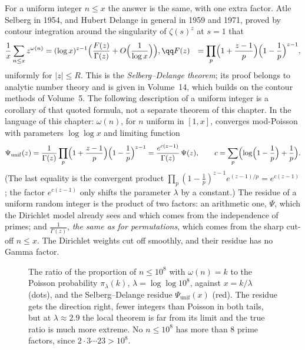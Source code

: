 For a uniform integer $n\le x$ the answer is the same, with one extra factor. Atle Selberg in 1954, and Hubert Delange in general in 1959 and 1971, proved by contour integration around the singularity of $\zeta(s)^z$ at $s=1$ that
\begin{equation}\label{eq:selbergdelange}
\begin{aligned}\frac1x\sum_{n\le x}z^{\omega(n)}&=(\log x)^{z-1}\Bigl(\frac{F(z)}{\Gamma(z)}+O\Bigl(\frac1{\log x}\Bigr)\Bigr),\qq F(z)&=\prod_p\Bigl(1+\frac{z-1}p\Bigr)\Bigl(1-\frac1p\Bigr)^{z-1},\end{aligned}
\end{equation}
uniformly for $|z|\le R$. This is the \emph{Selberg--Delange theorem}; its proof belongs to analytic number theory and is given in Volume~14, which builds on the contour methods of Volume~5. The following description of a uniform integer is a corollary of that quoted formula, not a separate theorem of this chapter. In the language of this chapter: $\omega(n)$, for $n$ uniform in $[1,x]$,
converges mod-Poisson with parameters $\log\log x$ and limiting function
\[
\Psi_{\mathrm{unif}}(z)=\frac1{\Gamma(z)}\prod_p\Bigl(1+\frac{z-1}p\Bigr)\Bigl(1-\frac1p\Bigr)^{z-1}=\frac{e^{c(z-1)}}{\Gamma(z)}\,\Psi(z),\qquad c=\sum_p\Bigl(\log\Bigl(1-\frac1p\Bigr)+\frac1p\Bigr).
\]
(The last equality is the convergent product $\prod_p(1-\frac1p)^{z-1}e^{(z-1)/p}=e^{c(z-1)}$; the factor $e^{c(z-1)}$ only shifts the parameter $\lambda$ by a constant.) The residue of a uniform random integer is the product of two factors:
an arithmetic one, $\Psi$, which the Dirichlet model already sees and which comes from the independence of primes; and $\frac1{\Gamma(z)}$, \emph{the same as for permutations}, which comes from the sharp cut-off $n\le x$. The Dirichlet weights cut off
smoothly, and their residue has no Gamma factor.

\begin{figure}[ht]
\centering{}
\caption{The ratio of the proportion of $n\le10^8$ with $\omega(n)=k$ to the Poisson probability $\pi_\lambda(k)$, $\lambda=\log\log10^8$, against $x=k/\lambda$ (dots), and the Selberg--Delange residue $\Psi_{\mathrm{unif}}(x)$ (red). The residue gets the
direction right, fewer integers than Poisson in both tails, but at $\lambda\approx2.9$ the local theorem is far from its limit and the true ratio is much more extreme. No $n\le10^8$ has more than $8$ prime factors, since $2\cdot3\cdots23>10^8$.}
\label{fig:omegaratio}
\end{figure}

